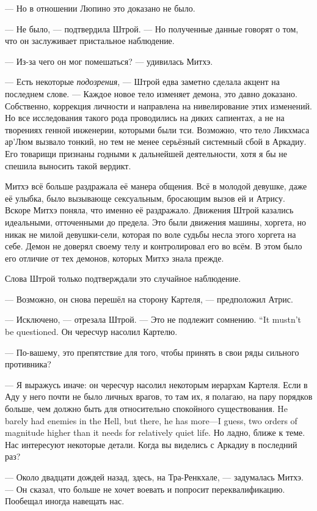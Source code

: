 --- Но в отношении Люпино это доказано не было.

--- Не было, --- подтвердила Штрой.
--- Но полученные данные говорят о том, что он заслуживает пристальное наблюдение.

--- Из-за чего он мог помешаться? --- удивилась Митхэ.

--- Есть некоторые \emph{подозрения}, --- Штрой едва заметно сделала акцент на последнем слове.
--- Каждое новое тело изменяет демона, это давно доказано.
Собственно, коррекция личности и направлена на нивелирование этих изменений.
Но все исследования такого рода проводились на диких сапиентах, а не на творениях генной инженерии, которыми были тси.
Возможно, что тело Ликхмаса ар’Люм вызвало тонкий, но тем не менее серьёзный системный сбой в Аркадиу.
Его товарищи признаны годными к дальнейшей деятельности, хотя я бы не спешила выносить такой вердикт.

Митхэ всё больше раздражала её манера общения.
Всё в молодой девушке, даже её улыбка, было вызывающе сексуальным, бросающим вызов ей и Атрису.
Вскоре Митхэ поняла, что именно её раздражало.
Движения Штрой казались идеальными, отточенными до предела.
Это были движения машины, хоргета, но никак не милой девушки-сели, которая по воле судьбы несла этого хоргета на себе.
Демон не доверял своему телу и контролировал его во всём.
В этом было его отличие от тех демонов, которых Митхэ знала прежде.

Слова Штрой только подтверждали это случайное наблюдение.

--- Возможно, он снова перешёл на сторону Картеля, --- предположил Атрис.

--- Исключено, --- отрезала Штрой.
{--- Это не подлежит сомнению.}
{``It mustn't be questioned.}
Он чересчур насолил Картелю.

--- По-вашему, это препятствие для того, чтобы принять в свои ряды сильного противника?

--- Я выражусь иначе: он чересчур насолил некоторым иерархам Картеля.
{Если в Аду у него почти не было личных врагов, то там их, я полагаю, на пару порядков больше, чем должно быть для относительно спокойного существования.}
{He barely had enemies in the Hell, but there, he has more---I guess, two orders of magnitude higher than it needs for relatively quiet life.}
Но ладно, ближе к теме.
Нас интересуют некоторые детали.
Когда вы виделись с Аркадиу в последний раз?

--- Около двадцати дождей назад, здесь, на Тра-Ренкхале, --- задумалась Митхэ.
--- Он сказал, что больше не хочет воевать и попросит переквалификацию.
Пообещал иногда навещать нас.

